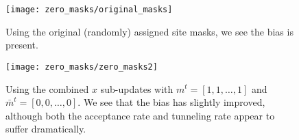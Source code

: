 \begin{figure}[htpb]
  \centering
  \texttt{[image: zero\_masks/original\_masks]}
  \caption{Using the original (randomly) assigned site masks, we see the bias
  is present.}
\end{figure}
%
\begin{figure}[htpb]
  \centering
  \texttt{[image: zero\_masks/zero\_masks2]}
  \caption{Using the combined \(x\) sub-updates with \(m^{t} = [1, 1, \ldots,
    1]\) and \(\bar{m}^{t} = [0, 0, \ldots, 0]\). We see that the bias has
    slightly improved, although both the acceptance rate and tunneling rate
  appear to suffer dramatically.}
\end{figure}

  
%

